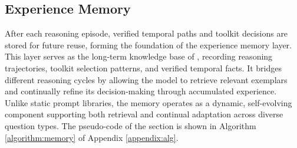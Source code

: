 


\subsection{Experience Memory}
\label{sec:memory}



After each reasoning episode, verified temporal paths and toolkit decisions are stored for future reuse, 
forming the foundation of the experience memory layer.  
This layer serves as the long-term knowledge base of \mot, 
recording reasoning trajectories, toolkit selection patterns, and verified temporal facts.  
It bridges different reasoning cycles by allowing the model to retrieve relevant exemplars 
and continually refine its decision-making through accumulated experience.  
Unlike static prompt libraries, the memory operates as a dynamic, self-evolving component supporting both retrieval and continual adaptation across diverse question types.
The pseudo-code of the section is shown in Algorithm \ref{algorithm:memory} of Appendix \ref{appendix:alg}.



